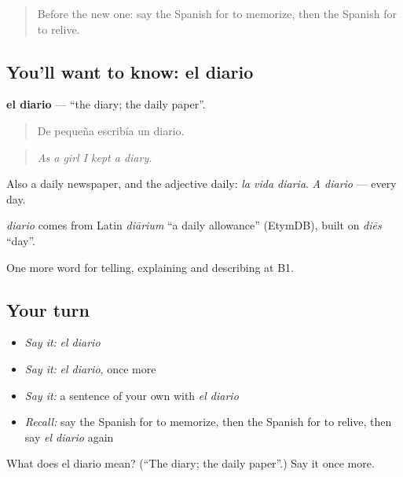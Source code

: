 \label{lesson:ES-C764-diario}



\begin{quote}
Before the new one: say the Spanish for to memorize, then the Spanish for to relive.
\end{quote}

\subsection*{You'll want to know: el diario}
\textbf{el diario} — \textquotedblleft{}the diary; the daily paper\textquotedblright{}.

\begin{quote}
De pequeña escribía un diario.
\end{quote}

\begin{quote}
\emph{As a girl I kept a diary.}
\end{quote}

Also a daily newspaper, and the adjective daily: \emph{la vida diaria}. \emph{A diario} — every day.

\begin{cousinweb}
\emph{diario} comes from Latin \emph{diārium} \textquotedblleft{}a daily allowance\textquotedblright{} (EtymDB), built on \emph{diēs} \textquotedblleft{}day\textquotedblright{}.
\end{cousinweb}

\begin{grammarlens}[title={What you've built}]
One more word for telling, explaining and describing at B1.
\end{grammarlens}

\subsection*{Your turn}
\begin{itemize}
\raggedright
  \item \emph{Say it:} \emph{el diario}
  \item \emph{Say it:} \emph{el diario}, once more
  \item \emph{Say it:} a sentence of your own with \emph{el diario}
  \item \emph{Recall:} say the Spanish for to memorize, then the Spanish for to relive, then say \emph{el diario} again
\end{itemize}

\begin{tcolorbox}[breakable,colback=teal!4,colframe=teal!35!black,title={Before you move on}]
What does el diario mean? (\textquotedblleft{}The diary; the daily paper\textquotedblright{}.) Say it once more.
\end{tcolorbox}
